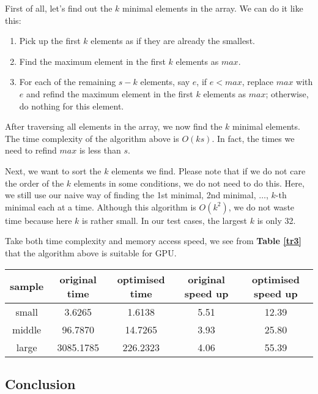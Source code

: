 \documentclass[11pt, a4paper]{article}
\makeatletter
\newcommand\tcaption{\def\@captype{table}\caption}
\newcommand{\tref}[1]{\textbf{Table \ref{#1}}}
\makeatother
\begin{document}
First of all, let's find out the $k$ minimal elements in the array. We can do it like this:

\begin{enumerate}
    \item Pick up the first $k$ elements as if they are already the smallest.
    \item Find the maximum element in the first $k$ elements as $max$.
    \item For each of the remaining $s - k$ elements, say $e$, if $e < max$, replace $max$ with $e$ and refind the maximum element in the first $k$ elements as $max$; otherwise, do nothing for this element.
\end{enumerate}

After traversing all elements in the array, we now find the $k$ minimal elements. The time complexity of the algorithm above is $O(ks)$. In fact, the times we need to refind $max$ is less than $s$.

Next, we want to sort the $k$ elements we find. Please note that if we do not care the order of the $k$ elements in some conditions, we do not need to do this. Here, we still use our naive way of finding the 1st minimal, 2nd minimal, $\ldots$, $k$-th minimal each at a time. Although this algorithm is $O(k^2)$, we do not waste time because here $k$ is rather small. In our test cases, the largest $k$ is only 32.

Take both time complexity and memory access speed, we see from \tref{tr3} that the algorithm above is suitable for GPU.

\begin{center}
    \tcaption{Time cost of sorting using trick 3}\label{tr3}
    \begin{tabular}{ccccc}
        \toprule
        sample & original time & optimised time & original speed up & optimised speed up \\
        \midrule
        small & 3.6265 & 1.6138 & 5.51 & 12.39 \\
        middle & 96.7870 & 14.7265 & 3.93 & 25.80 \\
        large & 3085.1785 & 226.2323 & 4.06 & 55.39 \\
        \bottomrule
    \end{tabular}
\end{center}

\subsection{Conclusion}
\end{document}
